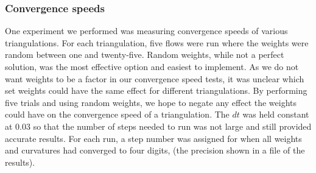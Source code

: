 \documentclass[12pt]{article}
\begin{document}
\subsubsection{Convergence speeds}

One experiment we performed was measuring convergence speeds of various triangulations. For each triangulation, five flows were run where the weights were random between one and twenty-five. Random weights, while not a perfect solution, was the most effective option and easiest to implement. As we do not want weights to be a factor in our convergence speed tests, it was unclear which set weights could have the same effect for different triangulations. By performing five trials and using random weights, we hope to negate any effect the weights could have on the convergence speed of a triangulation. The $dt$ was held constant at 0.03 so that the number of steps needed to run was not large and still provided accurate results. For each run, a step number was assigned for when all weights and curvatures had converged to four digits, (the precision shown in a file of the results).\newline
\end{document}
